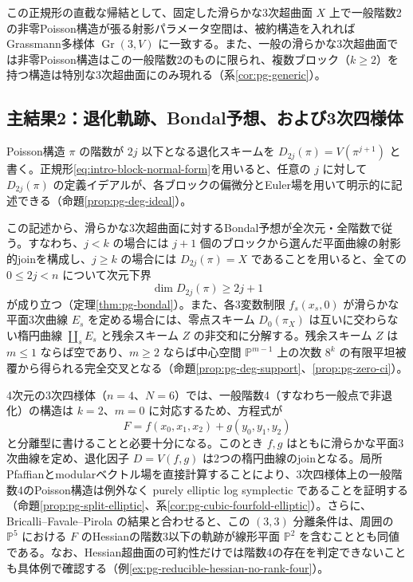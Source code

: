 この正規形の直截な帰結として、固定した滑らかな3次超曲面 $X$ 上で一般階数2の非零Poisson構造が張る射影パラメータ空間は、被約構造を入れればGrassmann多様体 $\operatorname{Gr}(3,V)$ に一致する。また、一般の滑らかな3次超曲面では非零Poisson構造はこの一般階数2のものに限られ、複数ブロック（$k\ge2$）を持つ構造は特別な3次超曲面にのみ現れる（系\ref{cor:pg-generic}）。

\subsection*{主結果2：退化軌跡、Bondal予想、および3次四様体}
Poisson構造 $\pi$ の階数が $2j$ 以下となる退化スキームを $D_{2j}(\pi)=V(\pi^{j+1})$ と書く。正規形\eqref{eq:intro-block-normal-form}を用いると、任意の $j$ に対して $D_{2j}(\pi)$ の定義イデアルが、各ブロックの偏微分とEuler場を用いて明示的に記述できる（命題\ref{prop:pg-deg-ideal}）。

この記述から、滑らかな3次超曲面に対するBondal予想が全次元・全階数で従う。すなわち、$j<k$ の場合には $j+1$ 個のブロックから選んだ平面曲線の射影的joinを構成し、$j\ge k$ の場合には $D_{2j}(\pi)=X$ であることを用いると、全ての $0\le2j<n$ について次元下界
\begin{equation}\label{eq:intro-bondal}
\dim D_{2j}(\pi)\ge2j+1
\end{equation}
が成り立つ（定理\ref{thm:pg-bondal}）。また、各3変数制限 $f_s(x_s,0)$ が滑らかな平面3次曲線 $E_s$ を定める場合には、零点スキーム $D_0(\pi_X)$ は互いに交わらない楕円曲線 $\coprod_s E_s$ と残余スキーム $Z$ の非交和に分解する。残余スキーム $Z$ は $m\le1$ ならば空であり、$m\ge2$ ならば中心空間 $\mathbb P^{m-1}$ 上の次数 $8^k$ の有限平坦被覆から得られる完全交叉となる（命題\ref{prop:pg-deg-support}、\ref{prop:pg-zero-ci}）。

4次元の3次四様体（$n=4$、$N=6$）では、一般階数4（すなわち一般点で非退化）の構造は $k=2$、$m=0$ に対応するため、方程式が
\[
F=f(x_0,x_1,x_2)+g(y_0,y_1,y_2)
\]
と分離型に書けることと必要十分になる。このとき $f,g$ はともに滑らかな平面3次曲線を定め、退化因子 $D=V(f,g)$ は2つの楕円曲線のjoinとなる。局所Pfaffianとmodularベクトル場を直接計算することにより、3次四様体上の一般階数4のPoisson構造は例外なく purely elliptic log symplectic であることを証明する（命題\ref{prop:pg-split-elliptic}、系\ref{cor:pg-cubic-fourfold-elliptic}）。さらに、Bricalli--Favale--Pirola \cite[Theorem~3.4]{PBricalliFavalePirola} の結果と合わせると、この $(3,3)$ 分離条件は、周囲の $\mathbb P^5$ における $F$ のHessianの階数3以下の軌跡が線形平面 $\mathbb P^2$ を含むこととも同値である。なお、Hessian超曲面の可約性だけでは階数4の存在を判定できないことも具体例で確認する（例\ref{ex:pg-reducible-hessian-no-rank-four}）。

